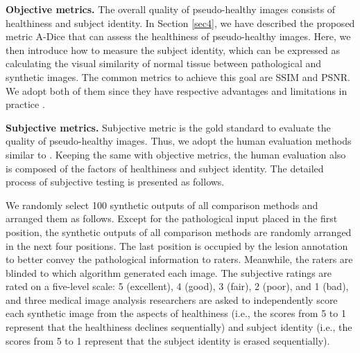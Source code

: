\documentclass[journal,twoside,web]{ieeecolor}
\begin{document}
\noindent\textbf{Objective metrics.} The overall quality of pseudo-healthy images consists of healthiness and subject identity.  In Section \ref{sec4}, we have described the proposed metric A-Dice that can assess the healthiness of pseudo-healthy images. Here, we then introduce how to measure the subject identity, which can be expressed as calculating the visual similarity of normal tissue between pathological and synthetic images. The common metrics to achieve this goal are SSIM and PSNR. We adopt both of them since they have respective advantages and limitations in practice \cite{hore2010image}.

\noindent\textbf{Subjective metrics.}  Subjective metric is the gold standard to evaluate the quality of pseudo-healthy images. Thus, we adopt the human evaluation methods similar to \cite{xia2020pseudo}. Keeping the same with objective metrics, the human evaluation also is composed of the factors of healthiness and subject identity. The detailed process of subjective testing is presented as follows.

We randomly select 100 synthetic outputs of all comparison methods and arranged them as follows. Except for the pathological input placed in the first position, the synthetic outputs of all comparison methods are randomly arranged in the next four positions. The last position is occupied by the lesion annotation to better convey the pathological information to raters. Meanwhile, the raters are blinded to which algorithm generated each image. The subjective ratings are rated on a five-level scale: 5 (excellent), 4 (good), 3 (fair), 2 (poor), and 1 (bad), and three medical image analysis researchers are asked to independently score each synthetic image from the aspects of healthiness (i.e., the scores from 5 to 1 represent that the healthiness declines sequentially) and subject identity (i.e., the scores from 5 to 1 represent that the subject identity is erased sequentially). 
\end{document}
